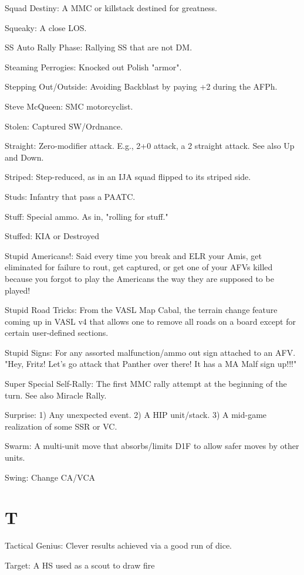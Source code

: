 \documentclass[letterpaper]{article}
\begin{document}
Squad Destiny: A MMC or killstack destined for greatness.

Squeaky: A close LOS.

SS Auto Rally Phase: Rallying SS that are not DM.

Steaming Perrogies: Knocked out Polish "armor".

Stepping Out/Outside: Avoiding Backblast by paying +2 during the AFPh.

Steve McQueen: SMC motorcyclist.

Stolen: Captured SW/Ordnance.

Straight: Zero-modifier attack. E.g., 2+0 attack, a 2 straight attack. See also Up and Down.

Striped:  Step-reduced, as in an IJA squad flipped to its striped side.

Studs: Infantry that pass a PAATC.

Stuff: Special ammo. As in, "rolling for stuff."

Stuffed: KIA or Destroyed

Stupid Americans!: Said every time you break and ELR your Amis, get eliminated for failure to rout, get captured, or get one of your AFVs killed because you forgot to play the Americans the way they are supposed to be played!

Stupid Road Tricks: From the VASL Map Cabal, the terrain change feature coming up in VASL v4 that allows one to remove all roads on a board except for certain user-defined sections.

Stupid Signs: For any assorted malfunction/ammo out sign attached to an AFV.  "Hey, Fritz!  Let's go attack that Panther over there!  It has a MA Malf sign up!!!"

Super Special Self-Rally: The first MMC rally attempt at the beginning of the turn. See also Miracle Rally.

Surprise: 1) Any unexpected event. 2) A HIP unit/stack. 3) A mid-game realization of some SSR or VC.

Swarm: A multi-unit move that absorbs/limits D1F to allow safer moves by other units.

Swing: Change CA/VCA

\section{T}

Tactical Genius: Clever results achieved via a good run of dice.

Target: A HS used as a scout to draw fire
\end{document}
